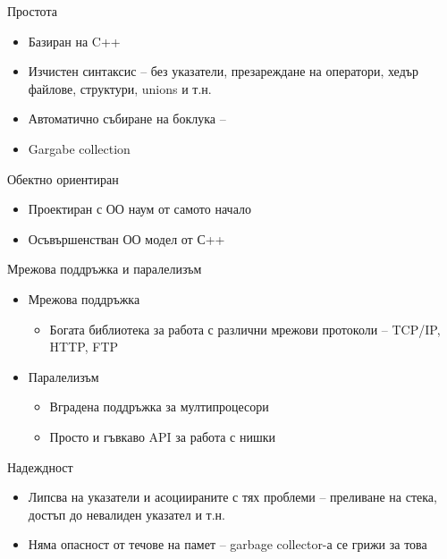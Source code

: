 \documentclass{beamer}
\begin{document}
\begin{frame}{Простота}
  \transdissolve  
  \begin{itemize}
    \item Базиран на C++
    \item Изчистен синтаксис – без указатели,
    презареждане на оператори, хедър
    файлове, структури, unions и т.н.
    \item Автоматично събиране на боклука –
    \item Gargabe collection
  \end{itemize}
\end{frame}

\begin{frame}{Обектно ориентиран}
  \transdissolve
  \begin{itemize}
  \item Проектиран с ОО наум от самото начало
  \item Осъвършенстван ОО модел от С++
  \end{itemize}
\end{frame}

\begin{frame}{Мрежова поддръжка и паралелизъм}
  \transdissolve
  \begin{itemize}
    \item Мрежова поддръжка
  \begin{itemize}
  \item   Богата библиотека за работа с различни
    мрежови протоколи – TCP/IP, HTTP, FTP

  \end{itemize}
  \item Паралелизъм
    \begin{itemize}
    \item  Вградена поддръжка за мултипроцесори
    \item Просто и гъвкаво API за работа с нишки
    \end{itemize}
  \end{itemize}
\end{frame}

\begin{frame}{Надеждност}
  \transdissolve
  \begin{itemize}
    \item Липсва на указатели и асоциираните с
    тях проблеми – преливане на стека,
    достъп до невалиден указател и т.н.

    \item Няма опасност от течове на памет –
    garbage collector-а се грижи за това
  \end{itemize}
\end{frame}
\end{document}
